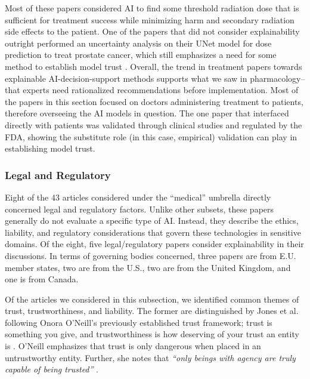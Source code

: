 \documentclass[authoryear,preprint,12pt]{elsarticle}
\begin{document}
Most of these papers considered AI to find some threshold radiation dose that is
sufficient for treatment success while minimizing harm and secondary radiation
side effects to the patient. One of the papers that did not consider
explainability outright performed an uncertainty analysis on their UNet model
for dose prediction to treat prostate cancer, which still emphasizes a need for
some method to establish model trust \cite{chenEvaluationAutomatedClinical2024}.
Overall, the trend in treatment papers towards explainable AI-decision-support
methods supports what we saw in pharmacology-- that experts need rationalized
recommendations before implementation. Most of the papers in this section
focused on doctors administering treatment to patients, therefore overseeing the
AI models in question. The one paper \cite{nimriInsulinDoseOptimization2020}
that interfaced directly with patients was validated through clinical studies
and regulated by the FDA, showing the substitute role (in this case, empirical)
validation can play in establishing model trust.

\subsubsection{Legal and Regulatory}
\label{sec:regulatory}
Eight of the 43 articles considered under the ``medical'' umbrella directly
concerned legal and regulatory factors. Unlike other subsets, these papers
generally do not evaluate a specific type of AI. Instead, they describe the
ethics, liability, and regulatory considerations that govern these technologies
in sensitive domains. Of the eight, five legal/regulatory papers consider
explainability in their discussions. In terms of governing bodies concerned,
three papers are from E.U. member states, two are from the U.S., two are from
the United Kingdom, and one is from Canada. 

Of the articles we considered in this subsection, we identified common themes of
trust, trustworthiness, and liability. The former are distinguished by Jones et
al. \cite{jonesArtificialIntelligenceClinical2023} following Onora O'Neill's
previously established trust framework; trust is something you give, and
trustworthiness is how deserving of your trust an entity is \cite{ONeill15032018}. O'Neill emphasizes
that trust is only dangerous when placed in an untrustworthy entity. Further,
she notes that \textit{``only beings with agency are truly capable of being
trusted''} \cite{jonesArtificialIntelligenceClinical2023}. 
\end{document}

